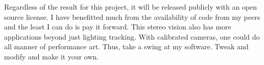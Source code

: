 \documentclass[
    12pt,
    twoside,
    bibstyle=chicago,
    headerstyle=uppercase,
	bibfile=biblatex_updating.bib
]{reedthesis}
\begin{document}
Regardless of the result for this project, it will be released publicly with an open source license. I have benefitted much from the availability of code from my peers and the least I can do is pay it forward. This stereo vision also has more applications beyond just lighting tracking. With calibrated cameras, one could do all manner of performance art. Thus, take a swing at my software. Tweak and modify and make it your own.



  \backmatter %

    \nocite{*}


%  
 \printbibliography[heading=bibintoc]

\end{document}
